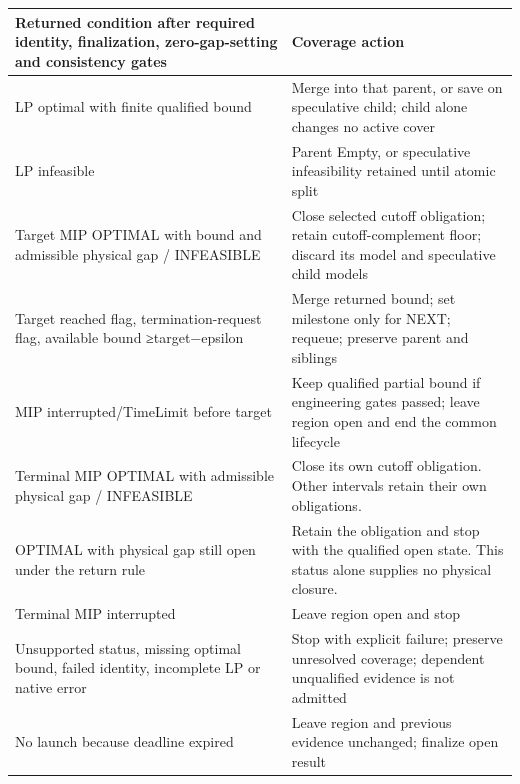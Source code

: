 \documentclass[
  american,
  11pt,
]{article}
\newcounter{none} %
\begin{document}
{\def\LTcaptype{none} %
\begin{longtable}[]{@{}
  >{\raggedright\arraybackslash}p{}
  >{\raggedright\arraybackslash}p{}@{}}
\toprule\noalign{}
\begin{minipage}[b]{\linewidth}\raggedright
Returned condition after required identity, finalization,
zero-gap-setting and consistency gates
\end{minipage} & \begin{minipage}[b]{\linewidth}\raggedright
Coverage action
\end{minipage} \\
\midrule\noalign{}
\endhead
\bottomrule\noalign{}
\endlastfoot
LP optimal with finite qualified bound & Merge into that parent, or save
on speculative child; child alone changes no active cover \\
LP infeasible & Parent Empty, or speculative infeasibility retained
until atomic split \\
Target MIP OPTIMAL with bound and admissible physical gap / INFEASIBLE &
Close selected cutoff obligation; retain cutoff-complement floor;
discard its model and speculative child models \\
Target reached flag, termination-request flag, available bound
≥target−epsilon & Merge returned bound; set milestone only for NEXT;
requeue; preserve parent and siblings \\
MIP interrupted/TimeLimit before target & Keep qualified partial bound
if engineering gates passed; leave region open and end the common
lifecycle \\
Terminal MIP OPTIMAL with admissible physical gap / INFEASIBLE & Close
its own cutoff obligation. Other intervals retain their own
obligations. \\
OPTIMAL with physical gap still open under the return rule & Retain the
obligation and stop with the qualified open state. This status alone
supplies no physical closure. \\
Terminal MIP interrupted & Leave region open and stop \\
Unsupported status, missing optimal bound, failed identity, incomplete
LP or native error & Stop with explicit failure; preserve unresolved
coverage; dependent unqualified evidence is not admitted \\
No launch because deadline expired & Leave region and previous evidence
unchanged; finalize open result \\
\end{longtable}
}
\end{document}

